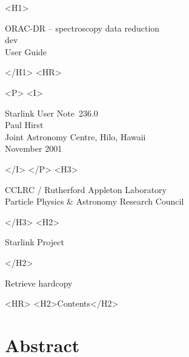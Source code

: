 \documentclass[twoside,11pt]{article}
\newcommand{\stardoccategory}  {Starlink User Note}
\newcommand{\stardocsource}    {sun\stardocnumber}
\newcommand{\stardocnumber}    {236.0}
\newcommand{\stardocauthors}   {Paul Hirst \\
                                Joint Astronomy Centre, Hilo, Hawaii}
\newcommand{\stardocdate}      {November 2001}
\newcommand{\stardoctitle}     {ORAC-DR -- spectroscopy data reduction}
\newcommand{\stardocversion}   {dev}
\newcommand{\stardocmanual}    {User Guide}
\newcommand{\htmladdnormallink}[2]{#1}
\newcommand{\htmladdimg}[1]{}
\newcommand{\htmlref}[2]{#1}
\newcommand{\htmladdtonavigation}[1]{}
\newcommand{\xlabel}[1]{}
\renewcommand{\_}{\texttt{\symbol{95}}}
\begin{document}
\begin{htmlonly}
   \xlabel{}
   \begin{rawhtml} <H1> \end{rawhtml}
      \stardoctitle\\
      \stardocversion\\
      \stardocmanual
   \begin{rawhtml} </H1> <HR> \end{rawhtml}


   \begin{rawhtml} <P> <I> \end{rawhtml}
   \stardoccategory\ \stardocnumber \\
   \stardocauthors \\
   \stardocdate
   \begin{rawhtml} </I> </P> <H3> \end{rawhtml}
      \htmladdnormallink{CCLRC / Rutherford Appleton Laboratory}
                        {http://www.cclrc.ac.uk} \\
      \htmladdnormallink{Particle Physics \& Astronomy Research Council}
                        {http://www.pparc.ac.uk} \\
   \begin{rawhtml} </H3> <H2> \end{rawhtml}
      \htmladdnormallink{Starlink Project}{http://www.starlink.rl.ac.uk/}
   \begin{rawhtml} </H2> \end{rawhtml}
   \htmladdnormallink{\htmladdimg{source.gif} Retrieve hardcopy}
      {http://www.starlink.rl.ac.uk/cgi-bin/hcserver?\stardocsource}\\

  \label{stardoccontents}
  \begin{rawhtml} 
    <HR>
    <H2>Contents</H2>
  \end{rawhtml}
  \htmladdtonavigation{\htmlref{\htmladdimg{contents_motif.gif}}
        {stardoccontents}}

  \section{\xlabel{abstract}Abstract}
\end{htmlonly}
\end{document}
